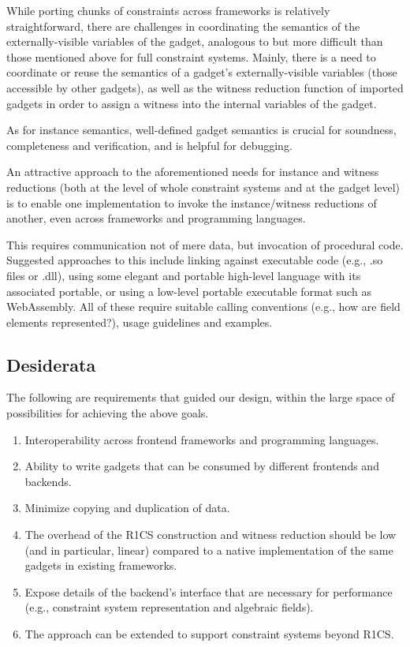 \documentclass[a4paper,12pt]{article}
\begin{document}
While porting chunks of constraints across frameworks is relatively straightforward, there are challenges in coordinating the semantics of the externally-visible variables of the gadget, analogous to but more difficult than those mentioned above for full constraint systems. Mainly, there is a need to coordinate or reuse the semantics of a gadget’s externally-visible variables (those accessible by other gadgets), as well as the witness reduction function of imported gadgets in order to assign a witness into the internal variables of the gadget.

As for instance semantics, well-defined gadget semantics is crucial for soundness, completeness and verification, and is helpful for debugging.

An attractive approach to the aforementioned needs for instance and witness reductions (both at the level of whole constraint systems and at the gadget level) is to enable one implementation to invoke the instance/witness reductions of another, even across frameworks and programming languages.

This requires communication not of mere data, but invocation of procedural code. Suggested approaches to this include linking against executable code (e.g., .so files or .dll), using some elegant and portable high-level language with its associated portable, or using a low-level portable executable format such as WebAssembly. All of these require suitable calling conventions (e.g., how are field elements represented?), usage guidelines and examples.


\subsection{Desiderata}
The following are requirements that guided our design, within the large space of possibilities for achieving the above goals.

\begin{enumerate}
	\item Interoperability across frontend frameworks and programming languages.
	\item Ability to write gadgets that can be consumed by different frontends and backends.
	\item Minimize copying and duplication of data.
	\item The overhead of the R1CS construction and witness reduction should be low (and in particular, linear) compared to a native implementation of the same gadgets in existing frameworks.
	\item Expose details of the backend's interface that are necessary for performance (e.g., constraint system representation and algebraic fields).
	\item The approach can be extended to support constraint systems beyond R1CS.
\end{enumerate}
\end{document}

